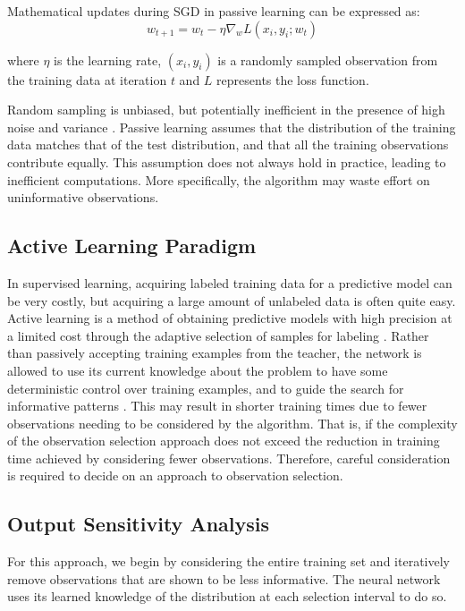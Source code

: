 \documentclass[10pt, conference]{IEEEtran}
\begin{document}
Mathematical updates during SGD in passive learning can be expressed as:
\[
w_{t+1} = w_t - \eta \nabla_{w} L(x_i, y_i; w_t)
\]

where $\eta$ is the learning rate, $(x_i, y_i)$ is a randomly sampled observation 
from the training data at iteration $t$ and $L$ represents the loss function.



Random sampling is unbiased, but potentially inefficient in the presence of high noise and variance \cite{mahdavi}. Passive learning assumes that the distribution of the training data matches that of the test distribution, and that all the training observations contribute equally. This assumption does not always hold in practice, leading to inefficient computations. More specifically, the algorithm may waste effort on uninformative observations.


\subsection{Active Learning Paradigm}
In supervised learning, acquiring labeled training data for a predictive model can be very costly, but acquiring a large amount of unlabeled data is often quite easy. Active learning is a method of obtaining predictive models with high precision at a limited cost through the adaptive selection of samples for labeling \cite{Hino2020ActiveLP}. Rather than passively accepting training examples from the teacher, the network is allowed to use its current knowledge about the problem to have some deterministic control over training examples, and to guide the search for informative patterns \cite{sasla}. This may result in shorter training times due to fewer observations needing to be considered by the algorithm. That is, if the complexity of the observation selection approach does not exceed the reduction in training time achieved by considering fewer observations. Therefore, careful consideration is required to decide on an approach to observation selection.



\subsection{Output Sensitivity Analysis}
For this approach, we begin by considering the entire training set and iteratively remove observations that are shown to be less informative. The neural network uses its learned knowledge of the distribution at each selection interval to do so.
\end{document}
